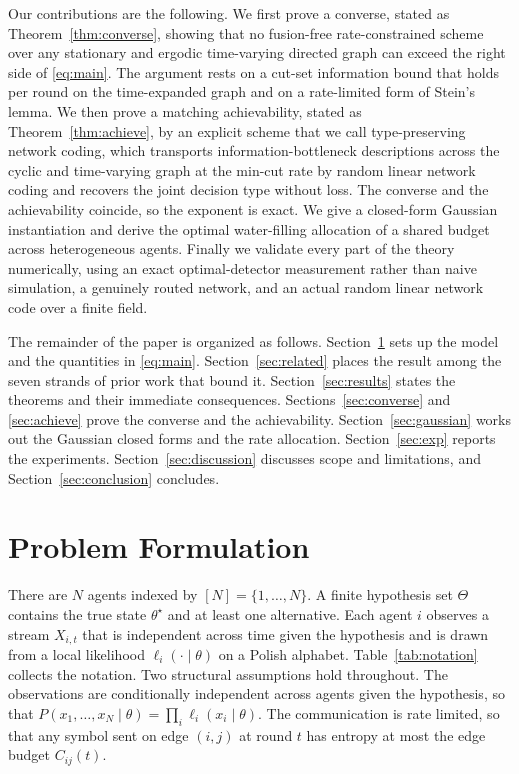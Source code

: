 \documentclass[journal]{IEEEtran}
\theoremstyle{definition}
\theoremstyle{remark}
\begin{document}
Our contributions are the following. We first prove a converse, stated as Theorem~\ref{thm:converse}, showing
that no fusion-free rate-constrained scheme over any stationary and ergodic time-varying directed graph can
exceed the right side of \eqref{eq:main}. The argument rests on a cut-set information bound that holds per round
on the time-expanded graph and on a rate-limited form of Stein's lemma. We then prove a matching achievability,
stated as Theorem~\ref{thm:achieve}, by an explicit scheme that we call type-preserving network coding, which
transports information-bottleneck descriptions across the cyclic and time-varying graph at the min-cut rate by
random linear network coding and recovers the joint decision type without loss. The converse and the
achievability coincide, so the exponent is exact. We give a closed-form Gaussian instantiation and derive the
optimal water-filling allocation of a shared budget across heterogeneous agents. Finally we validate every part
of the theory numerically, using an exact optimal-detector measurement rather than naive simulation, a genuinely
routed network, and an actual random linear network code over a finite field.

The remainder of the paper is organized as follows. Section~\ref{sec:model} sets up the model and the quantities
in \eqref{eq:main}. Section~\ref{sec:related} places the result among the seven strands of prior work that bound
it. Section~\ref{sec:results} states the theorems and their immediate consequences. Sections~\ref{sec:converse}
and \ref{sec:achieve} prove the converse and the achievability. Section~\ref{sec:gaussian} works out the Gaussian
closed forms and the rate allocation. Section~\ref{sec:exp} reports the experiments.
Section~\ref{sec:discussion} discusses scope and limitations, and Section~\ref{sec:conclusion} concludes.

\section{Problem Formulation}\label{sec:model}
There are $N$ agents indexed by $[N]=\{1,\dots,N\}$. A finite hypothesis set $\Theta$ contains the true state
$\theta^\star$ and at least one alternative. Each agent $i$ observes a stream $X_{i,t}$ that is independent across
time given the hypothesis and is drawn from a local likelihood $\ell_i(\cdot\mid\theta)$ on a Polish alphabet.
Table~\ref{tab:notation} collects the notation. Two structural assumptions hold throughout. The observations are
conditionally independent across agents given the hypothesis, so that
$P(x_1,\dots,x_N\mid\theta)=\prod_i \ell_i(x_i\mid\theta)$. The communication is rate limited, so that any symbol
sent on edge $(i,j)$ at round $t$ has entropy at most the edge budget $C_{ij}(t)$.
\end{document}
